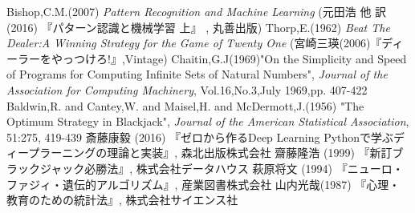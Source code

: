 \begin{thebibliography}{9}
   Bishop,C.M.(2007) {\it{Pattern Recognition and Machine Learning}} (元田浩 他 訳 (2016) 『パターン認識と機械学習 上』 , 丸善出版)
   Thorp,E.(1962) {\it{Beat The Dealer:A Winning Strategy for the Game of Twenty One}} (宮崎三瑛(2006)『ディーラーをやっつけろ!』,Vintage)
   Chaitin,G.J(1969)"On the Simplicity and Speed of Programs for Computing Infinite Sets of Natural Numbers", {\it{Journal of the Association for Computing Machinery}}, Vol.16,No.3,July 1969,pp. 407-422
   Baldwin,R. and Cantey,W. and Maisel,H. and McDermott,J.(1956) "The Optimum Strategy in Blackjack", {\it{Journal of the American Statistical Association}}, 51:275, 419-439
   斎藤康毅 (2016) 『ゼロから作るDeep Learning Pythonで学ぶディープラーニングの理論と実装』, 森北出版株式会社
   齋藤隆浩 (1999) 『新訂ブラックジャック必勝法』, 株式会社データハウス
   萩原将文 (1994) 『ニューロ・ファジィ・遺伝的アルゴリズム』, 産業図書株式会社
   山内光哉(1987) 『心理・教育のための統計法』, 株式会社サイエンス社
\end{thebibliography}
